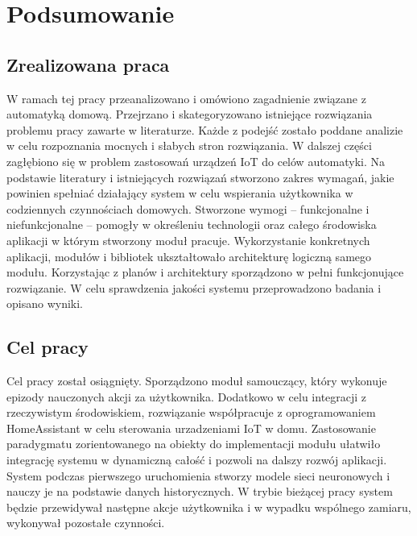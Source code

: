 
\chapter*{Podsumowanie}
\section*{Zrealizowana praca}
W ramach tej pracy przeanalizowano i omówiono zagadnienie związane z automatyką domową. Przejrzano i skategoryzowano istniejące rozwiązania problemu pracy zawarte w literaturze. Każde z podejść zostało poddane analizie w celu rozpoznania mocnych i słabych stron rozwiązania. W dalszej części zagłębiono się w problem zastosowań urządzeń IoT do celów automatyki. Na podstawie literatury i istniejących rozwiązań stworzono zakres wymagań, jakie powinien spełniać działający system w celu wspierania użytkownika w codziennych czynnościach domowych. Stworzone wymogi -- funkcjonalne i niefunkcjonalne -- pomogły w określeniu technologii oraz całego środowiska aplikacji w którym stworzony moduł pracuje. Wykorzystanie konkretnych aplikacji, modułów i bibliotek ukształtowało architekturę logiczną samego modułu. Korzystając z planów i architektury sporządzono w pełni funkcjonujące rozwiązanie. W celu sprawdzenia jakości systemu przeprowadzono badania i opisano wyniki.

\section*{Cel pracy}
Cel pracy został osiągnięty. Sporządzono moduł samouczący, który wykonuje epizody nauczonych akcji za użytkownika. Dodatkowo w celu integracji z rzeczywistym środowiskiem, rozwiązanie współpracuje z oprogramowaniem HomeAssistant w celu sterowania urzadzeniami IoT w domu. Zastosowanie paradygmatu zorientowanego na obiekty do implementacji modułu ułatwiło integrację systemu w dynamiczną całość i pozwoli na dalszy rozwój aplikacji. System podczas pierwszego uruchomienia stworzy modele sieci neuronowych i nauczy je na podstawie danych historycznych. W trybie bieżącej pracy system będzie przewidywał następne akcje użytkownika i w wypadku wspólnego zamiaru, wykonywał pozostałe czynności.

